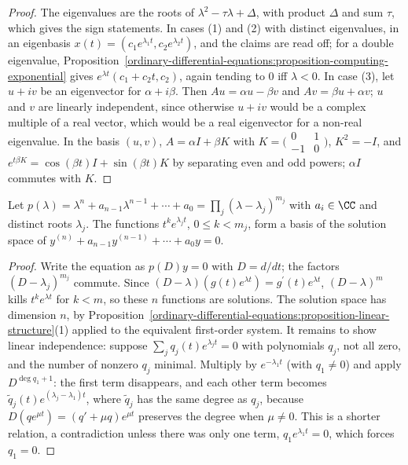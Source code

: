 \begin{proof}
The eigenvalues are the roots of $\lambda^2 - \tau\lambda + \Delta$, with product $\Delta$ and sum $\tau$, which gives the sign statements. In cases (1) and (2) with distinct eigenvalues, in an eigenbasis $x(t) = (c_1e^{\lambda_1t}, c_2e^{\lambda_2t})$,
and the claims are read off; for a double eigenvalue, Proposition~\ref{ordinary-differential-equations:proposition-computing-exponential} gives $e^{\lambda t}(c_1 + c_2t, c_2)$, again tending to $0$ iff $\lambda < 0$. In case (3), let
$u + iv$ be an eigenvector for $\alpha + i\beta$. Then $Au = \alpha u - \beta v$ and $Av = \beta u + \alpha v$; $u$ and $v$ are linearly independent, since otherwise $u + iv$ would be a complex multiple of a real vector, which would be a real
eigenvector for a non-real eigenvalue. In the basis $(u, v)$, $A = \alpha I + \beta K$ with $K = \bigl(\begin{smallmatrix}0 & 1\\ -1 & 0\end{smallmatrix}\bigr)$, $K^2 = -I$, and $e^{t\beta K} = \cos(\beta t)I + \sin(\beta t)K$ by
separating even and odd powers; $\alpha I$ commutes with $K$.
\end{proof}

\begin{theorem}\label{ordinary-differential-equations:theorem-constant-coefficients}
Let $p(\lambda) = \lambda^n + a_{n-1}\lambda^{n-1} + \cdots + a_0 = \prod_j(\lambda - \lambda_j)^{m_j}$ with $a_i \in \CC$ and distinct roots $\lambda_j$. The functions $t^ke^{\lambda_jt}$, $0 \leq k < m_j$, form a basis of the solution space
of $y^{(n)} + a_{n-1}y^{(n-1)} + \cdots + a_0y = 0$.
\end{theorem}

\begin{proof}
Write the equation as $p(D)y = 0$ with $D = d/dt$; the factors $(D - \lambda_j)^{m_j}$ commute. Since $(D - \lambda)(g(t)e^{\lambda t}) = g^{\prime}(t)e^{\lambda t}$, $(D - \lambda)^m$ kills $t^ke^{\lambda t}$ for $k < m$, so these $n$ functions are
solutions. The solution space has dimension $n$, by Proposition~\ref{ordinary-differential-equations:proposition-linear-structure}(1) applied to the equivalent first-order system. It remains to show linear independence: suppose
$\sum_jq_j(t)e^{\lambda_jt} = 0$ with polynomials $q_j$, not all zero, and the number of nonzero $q_j$ minimal. Multiply by $e^{-\lambda_1t}$ (with $q_1 \neq 0$) and apply $D^{\deg q_1 + 1}$: the first term disappears, and each other term
becomes $\tilde q_j(t)e^{(\lambda_j - \lambda_1)t}$, where $\tilde q_j$ has the same degree as $q_j$, because $D(qe^{\mu t}) = (q' + \mu q)e^{\mu t}$ preserves the degree when $\mu \neq 0$. This is a shorter relation, a contradiction unless
there was only one term, $q_1e^{\lambda_1t} = 0$, which forces $q_1 = 0$.
\end{proof}

